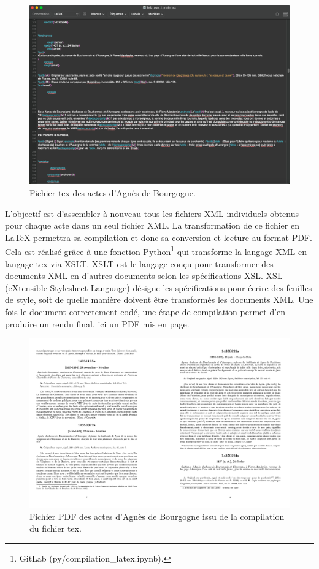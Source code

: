\begin{figure}[H]
    \centering
    \includegraphics[scale=0.39]{front/images/latex.png}
    \caption{Fichier tex des actes d'Agnès de Bourgogne.}
    \label{fig:latex_agnes_db}
\end{figure}

\newpage 

\par L'objectif est d'assembler à nouveau tous les fichiers XML individuels obtenus pour chaque acte dans un seul fichier XML. La transformation de ce fichier en LaTeX permettra sa compilation et donc sa conversion et lecture au format PDF. Cela est réalisé grâce à une fonction Python\footnote{GitLab (py/compilation\_latex.ipynb).} qui transforme la langage XML en langage tex via XSLT. XSLT est le langage conçu pour transformer des documents XML en d’autres documents selon les spécifications XSL. XSL (eXtensible Stylesheet Language) désigne les spécifications pour écrire des feuilles de style, soit de quelle manière doivent être transformés les documents XML. Une fois le document correctement codé, une étape de compilation permet d'en produire un rendu final, ici un PDF mis en page. 

\begin{figure}[H]
    \centering
    \includegraphics[scale=0.41]{front/images/pdf_compile_ab.png}
    \caption{Fichier PDF des actes d'Agnès de Bourgogne issu de la compilation du fichier tex.}
    \label{fig:pdf_conpile}
\end{figure} 


